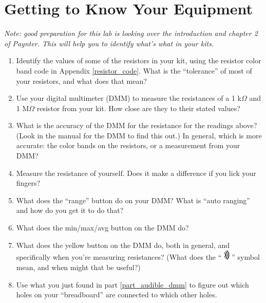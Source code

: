 \section{Getting to Know Your Equipment}
\label{lab_equipment}


\bigskip

\textit{Note: good preparation for this lab is looking over the introduction and chapter 2 of Paynter.  This will help you to identify what's what in your kits.}

\begin{enumerate}[wide]

\item Identify the values of some of the resistors in your kit, using the resistor color band code 
in Appendix \ref{resistor_code}.
What is the ``tolerance'' of most of your resistors, and what does that mean?   

\item Use your digital multimeter (DMM) to measure the resistances of a 1 k$\Omega$ and 1 M$\Omega$ resistor from your kit.  How close are they to their stated values?

\item What is the accuracy of the DMM for the resistance for the readings above?  (Look in the manual for the DMM to find this out.)  In general, which is more accurate: the color bands on the resistors, or a measurement from your DMM?

\item Measure the resistance of yourself.  Does it make a difference if you lick your fingers?  

\item What does the ``range'' button do on your DMM?  What is ``auto ranging'' and how do you get it to do that?

\item What does the min/max/avg button on the DMM do?

\item What does the yellow button on the DMM do, both in general, and specifically when you're measuring resistances?  (What does the ``
\includegraphics[height=0.2in]{equipment/sound.eps}
'' symbol mean, and when might that be useful?) \label{part_audible_dmm}

\item Use what you just found in part \ref{part_audible_dmm} to figure out which holes on your ``breadboard'' are connected to which other holes.   


\end{enumerate}
